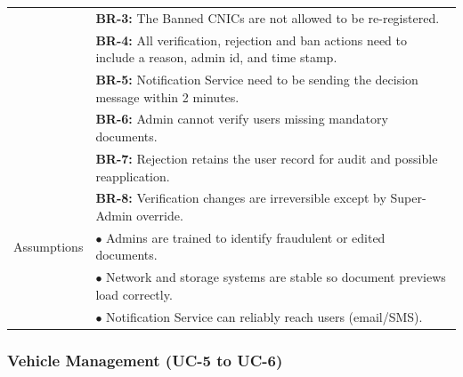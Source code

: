 \begin{longtable}{|>{\raggedright\arraybackslash}p{4cm}|>{\raggedright\arraybackslash}p{11cm}|}
& \textbf{BR-3:} The Banned CNICs are not allowed to be re-registered. \\
& \textbf{BR-4:} All verification, rejection and ban actions need to include a reason, admin id, and time stamp. \\
& \textbf{BR-5:} Notification Service need to be sending the decision message within 2 minutes. \\
& \textbf{BR-6:} Admin cannot verify users missing mandatory documents. \\
& \textbf{BR-7:} Rejection retains the user record for audit and possible reapplication. \\
& \textbf{BR-8:} Verification changes are irreversible except by Super-Admin override. \\
\hline
Assumptions & $\bullet$ Admins are trained to identify fraudulent or edited documents. \\
& $\bullet$ Network and storage systems are stable so document previews load correctly. \\
& $\bullet$ Notification Service can reliably reach users (email/SMS). \\
\end{longtable}

\subsubsection{Vehicle Management (UC-5 to UC-6)}

